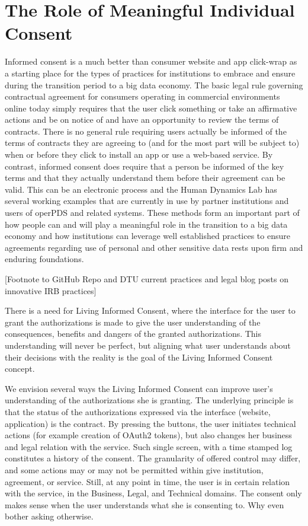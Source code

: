\section{The Role of Meaningful Individual Consent}

Informed consent is a much better than consumer website and app click-wrap as a starting place for the types of practices for institutions to embrace and ensure during the transition period to a big data economy.
The basic legal rule governing contractual agreement for consumers operating in commercial environments online today simply requires that the user click something or take an affirmative actions and be on notice of and have an opportunity to review the terms of contracts.
There is no general rule requiring users actually be informed of the terms of contracts they are agreeing to (and for the most part will be subject to) when or before they click to install an app or use a web-based service.
By contrast, informed consent does require that a person be informed of the key terms and that they actually understand them before their agreement can be valid.
This can be an electronic process and the Human Dynamics Lab has several working examples that are currently in use by partner institutions and users of operPDS and related systems.
These methods form an important part of how people can and will play a meaningful role in the transition to a big data economy and how institutions can leverage well established practices to ensure agreements regarding use of personal and other sensitive data rests upon firm and enduring foundations.

[Footnote to GitHub Repo and DTU current practices and legal blog posts on innovative IRB practices]

There is a need for Living Informed Consent, where the interface for the user to grant the authorizations is made to give the user understanding of the consequences, benefits and dangers of the granted authorizations.
This understanding will never be perfect, but aligning what user understands about their decisions with the reality is the goal of the Living Informed Consent concept.

We envision several ways the Living Informed Consent can improve user's understanding of the authorizations she is granting.
The underlying principle is that the status of the authorizations expressed via the interface (website, application) is the contract.
By pressing the buttons, the user initiates technical actions (for example creation of OAuth2 tokens), but also changes her business and legal relation with the service.
Such single screen, with a time stamped log constitutes a history of the consent. The granularity of offered control may differ, and some actions may or may not be permitted within give institution, agreement, or service.
Still, at any point in time, the user is in certain relation with the service, in the Business, Legal, and Technical domains.
The consent only makes sense when the user understands what she is consenting to. Why even bother asking otherwise.

